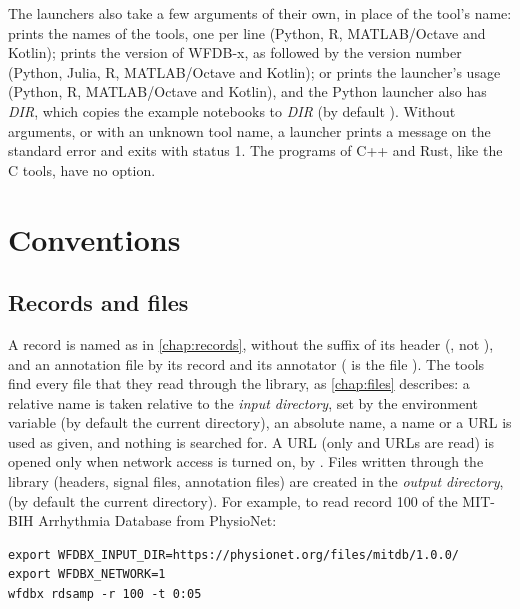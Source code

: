The launchers also take a few arguments of their own, in place of the tool's name:
 prints the names of the tools, one per line (Python, R, MATLAB/Octave and
Kotlin);  prints the version of WFDB-x, as  followed by the
version number (Python, Julia, R, MATLAB/Octave and Kotlin);  or 
prints the launcher's usage (Python, R, MATLAB/Octave and Kotlin), and the Python launcher
also has  \textit{DIR}, which copies the example notebooks to \textit{DIR}
(by default ). Without arguments, or with an unknown tool name, a
launcher prints a message on the standard error and exits with status 1. The programs of
C++ and Rust, like the C tools, have no  option.

\section{Conventions}
\label{sec:tools-conventions}

\subsection{Records and files}
\label{sec:tools-files}

A record is named as in \cref{chap:records}, without the suffix of its header
(, not ), and an annotation file by its record and its
annotator ( is the file ). The tools find every file
that they read through the library, as \cref{chap:files} describes: a relative name is
taken relative to the \emph{input directory}, set by the environment variable
 (by default the current directory), an absolute name, a \code{\textasciitilde}
name or a URL is used as given, and nothing is searched for. A URL (only  and
 URLs are read) is opened only when network access is turned on, by
. Files written through the library
(headers, signal files, annotation files) are created in the \emph{output directory},
 (by default the current directory). For example, to read record
100 of the MIT-BIH Arrhythmia Database from PhysioNet:
\begin{lstlisting}[style=shell]
export WFDBX_INPUT_DIR=https://physionet.org/files/mitdb/1.0.0/
export WFDBX_NETWORK=1
wfdbx rdsamp -r 100 -t 0:05
\end{lstlisting}


